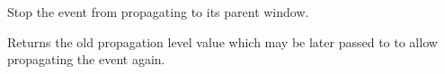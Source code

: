 \label{wxeventstoppropagation}


Stop the event from propagating to its parent window.

Returns the old propagation level value which may be later passed to 
 to allow propagating the
event again.

